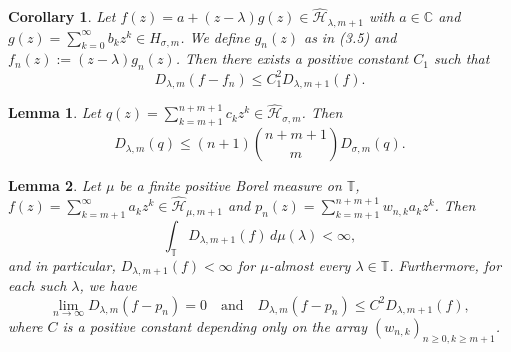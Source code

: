 \documentclass[10pt,a4paper]{amsart}
\newtheorem{lemma}{Lemma}
\newtheorem{corollary}{Corollary}
\begin{document}
\begin{corollary}\label{co4.6}
Let \( f(z) = a + (z - \lambda)g(z) \in \widehat{\mathcal{H}}_{\lambda, m+1} \) with $ a\in\mathbb{C} $ and $g(z) = \sum\limits_{k = 0}^\infty  {{b_k}{z^k}}  \in H_{\sigma, m} $. We define ${g_n}(z)$ as in (3.5) and ${f_n}(z) := (z - \lambda ){g_n}(z)$. Then there exists a positive constant ${C_1}$ such that
$${D_{\lambda ,m}}(f - {f_n}) \le C_1^2{D_{\lambda ,m+1}}(f).$$
\end{corollary}

 \begin{lemma}\label{lm4.7}
Let \( q(z) = \sum\limits_{k = m+1}^{n + m +1} c_k z^k \in \widehat{\mathcal{H}}_{\sigma, m} \). Then
\[
D_{\lambda ,m}(q) \le (n + 1) \binom{n+m+1}{m} D_{\sigma ,m}(q).
\]
\end{lemma}

\begin{lemma}\label{lm4.8}
Let \( \mu \) be a finite positive Borel measure on \( \mathbb{T} \), \(  f(z)=\sum\limits_{k = m+1}^\infty  {{a_k}{z^k}} \in \widehat{\mathcal{H}}_{\mu, m+1} \) and \( p_n(z) = \sum\limits_{k = m+1}^{n + m + 1} w_{n,k} a_k z^k \). Then
\[
\int_{\mathbb{T}} D_{\lambda,m+1}(f) \, d\mu(\lambda) < \infty,
\]
and in particular, \( D_{\lambda,m+1}(f) < \infty \) for \( \mu \)-almost every \(\lambda \in \mathbb{T} \). Furthermore, for each such \( \lambda \), we have
\[
\lim_{n \to \infty} D_{\lambda,m}(f - p_n) = 0 \quad \text{and} \quad
D_{\lambda,m}(f - p_n) \le C^2 D_{\lambda,m+1}(f),
\]
where \( C \) is a positive constant depending only on the array \( (w_{n,k})_{n \geq 0, k \geq m+1} \).
\end{lemma}
\end{document}
